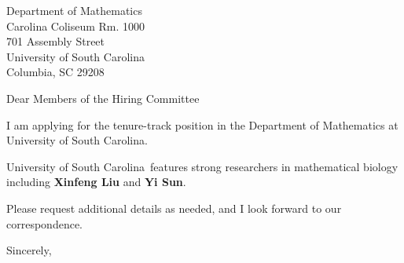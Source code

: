 




	
	
	\def\School{University of South Carolina}
	
	\begin{letter}
		{Department of Mathematics\\
			Carolina Coliseum Rm. 1000\\
			701 Assembly Street\\
			University of South Carolina\\
			Columbia, SC 29208
			
		}
		
		\opening{Dear Members of the Hiring Committee}
		
		
		I am applying for the tenure-track position in the Department of Mathematics at \School. 
		
		
		
		\School~features strong researchers in mathematical biology including \textbf{Xinfeng Liu} and \textbf{Yi Sun}. 
		
		
		
		
		
		Please request additional details as needed, and I look forward to our correspondence.
		
		\closing{Sincerely,}
	\end{letter}
